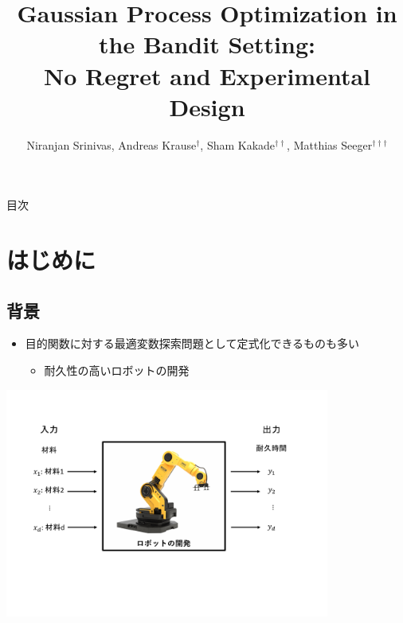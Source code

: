 \documentclass[dvipdfmx, 10.5pt]{beamer}
\title[]{Gaussian Process Optimization in the Bandit Setting:\\No Regret and Experimental Design}
\subtitle{}
\author[]{Niranjan Srinivas, Andreas Krause$^{\dag}$, Sham Kakade$^{\dag\dag}$, Matthias Seeger$^{\dag\dag\dag}$}
\institute[]{$\dag$: California Institute of Technology\\
$\dag\dag$: University of Pennsylvania\\
$\dag\dag\dag$: Saarland University}
\begin{document}

\begin{frame}
\maketitle%
\thispagestyle{empty}%
\end{frame}



\begin{frame}[noframenumbering]{目次}
	\tableofcontents[hideallsubsections]
	\thispagestyle{empty} %
\end{frame}

\section{はじめに}

\subsection{背景}
\begin{frame}{\insertsubsection}
	\begin{itemize}
		\item 目的関数に対する最適変数探索問題として定式化できるものも多い
		\begin{itemize}
			\item 耐久性の高いロボットの開発
		\end{itemize}
	\end{itemize}
	\vspace{10pt}
	\begin{center}
		\includegraphics[width=0.80\textwidth]{./Fig/Robot.pdf}
	\end{center}
\end{frame}
\end{document}
